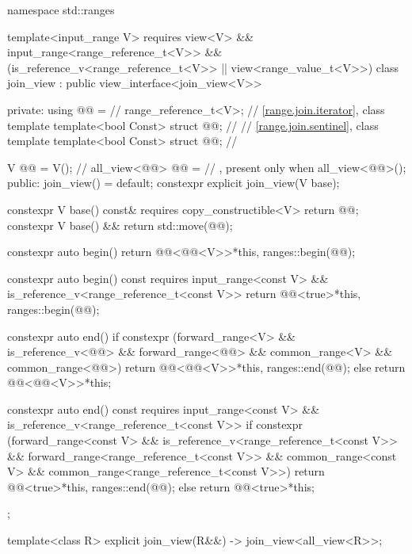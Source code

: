 %
%
%
%
\begin{codeblock}
namespace std::ranges {
  template<input_range V>
    requires view<V> && input_range<range_reference_t<V>> &&
             (is_reference_v<range_reference_t<V>> ||
              view<range_value_t<V>>)
  class join_view : public view_interface<join_view<V>> {
  private:
    using @@ =                    // \expos
      range_reference_t<V>;
    // \ref{range.join.iterator}, class template 
    template<bool Const>
      struct @@;                  // \expos
    // \ref{range.join.sentinel}, class template 
    template<bool Const>
      struct @@;                  // \expos

    V @@ = V();                      // \expos
    all_view<@@> @@ =         // \expos, present only when 
      all_view<@@>();
  public:
    join_view() = default;
    constexpr explicit join_view(V base);

    constexpr V base() const& requires copy_constructible<V> { return @@; }
    constexpr V base() && { return std::move(@@); }

    constexpr auto begin() {
      return @@<@@<V>>{*this, ranges::begin(@@)};
    }

    constexpr auto begin() const
    requires input_range<const V> &&
             is_reference_v<range_reference_t<const V>> {
      return @@<true>{*this, ranges::begin(@@)};
    }

    constexpr auto end() {
      if constexpr (forward_range<V> &&
                    is_reference_v<@@> && forward_range<@@> &&
                    common_range<V> && common_range<@@>)
        return @@<@@<V>>{*this, ranges::end(@@)};
      else
        return @@<@@<V>>{*this};
    }

    constexpr auto end() const
    requires input_range<const V> &&
             is_reference_v<range_reference_t<const V>> {
      if constexpr (forward_range<const V> &&
                    is_reference_v<range_reference_t<const V>> &&
                    forward_range<range_reference_t<const V>> &&
                    common_range<const V> &&
                    common_range<range_reference_t<const V>>)
        return @@<true>{*this, ranges::end(@@)};
      else
        return @@<true>{*this};
    }
  };

  template<class R>
    explicit join_view(R&&) -> join_view<all_view<R>>;
}
\end{codeblock}

